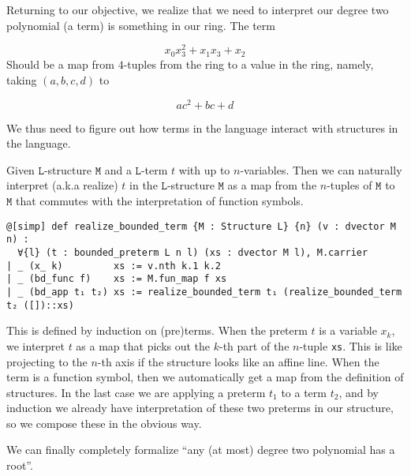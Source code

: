 Returning to our objective,
we realize that we need to interpret our degree two polynomial (a term)
is something in our ring. The term

\[ x_{0} x_{3}^{2} + x_{1} x_{3} + x_{2} \]
Should be a map from $4$-tuples from the ring to a value in the ring,
namely, taking $(a, b, c, d)$ to

\[ a c^{2} + b c + d \]

We thus need to figure out how terms in the language interact with
structures in the language.

\begin{dfn}
    Given $\texttt{L}$-structure $\texttt{M}$ and a $\texttt{L}$-term $t$ with up to $n$-variables.
    Then we can naturally interpret (a.k.a realize) $t$ in the $\texttt{L}$-structure $\texttt{M}$ as a
    map from the $n$-tuples of $\texttt{M}$ to $\texttt{M}$ that
    commutes with the interpretation of function symbols.

    \begin{lstlisting}
@[simp] def realize_bounded_term {M : Structure L} {n} (v : dvector M n) :
  ∀{l} (t : bounded_preterm L n l) (xs : dvector M l), M.carrier
| _ (x_ k)         xs := v.nth k.1 k.2
| _ (bd_func f)    xs := M.fun_map f xs
| _ (bd_app t₁ t₂) xs := realize_bounded_term t₁ (realize_bounded_term t₂ ([])::xs) \end{lstlisting}

    This is defined by induction on (pre)terms.
    When the preterm $t$ is a variable $x_{k}$, we interpret $t$ as a map
    that picks out the $k$-th part of the $n$-tuple \texttt{xs}.
    This is like projecting to the $n$-th axis if the structure looks like an affine line.
    When the term is a function symbol, then we automatically get a map from the
    definition of structures.
    In the last case we are applying a preterm $t_{1}$ to a term $t_{2}$,
    and by induction we already have interpretation of these two preterms
    in our structure, so we compose these in the obvious way.
\end{dfn}

We can finally completely formalize
``any (at most) degree two polynomial has a root''.


